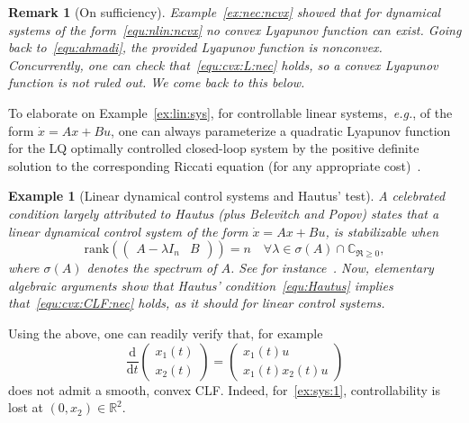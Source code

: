 \documentclass[letterpaper, 10 pt, conference]{ieeeconf}  %
\theoremstyle{mystyle}
\newtheorem{example}[theorem]{Example}
\newtheorem{remark}[theorem]{Remark}
\begin{document}
\begin{remark}[On sufficiency]
\label{rem:suff}
 Example~\ref{ex:nec:ncvx} showed that for dynamical systems of the form~\eqref{equ:nlin:ncvx} no convex Lyapunov function can exist. Going back to~\eqref{equ:ahmadi}, the provided Lyapunov function is nonconvex. Concurrently, one can check that~\eqref{equ:cvx:L:nec} holds, so a convex Lyapunov function is not ruled out. We come back to this below.   
\end{remark}

To elaborate on Example~\ref{ex:lin:sys}, for controllable linear systems,~\textit{e.g.}, of the form $\dot{x}=Ax+Bu$, one can always parameterize a quadratic Lyapunov function for the LQ optimally controlled closed-loop system by the positive definite solution to the corresponding Riccati equation (for any appropriate cost)~\cite[Thm.~42, Ex.~8.5.4]{ref:sontag2013mathematical}.

\begin{example}[Linear dynamical control systems and Hautus' test]
\label{ex:lin:control:sys}
A celebrated condition largely attributed to Hautus (plus Belevitch and Popov) states that a linear dynamical control system of the form $\dot{x}=Ax+Bu$, is stabilizable when 
\begin{equation}
    \label{equ:Hautus}
    \mathrm{rank}\left( \begin{pmatrix}A-\lambda I_n & B \end{pmatrix} \right)=n \quad \forall \lambda \in \sigma(A)\cap \mathbb{C}_{\Re\geq 0}, 
\end{equation}
where $\sigma(A)$ denotes the spectrum of $A$. See for instance~\cite[Ch.~3]{ref:trentelman2012control}.
Now, elementary algebraic arguments show that Hautus' condition~\eqref{equ:Hautus} implies that~\eqref{equ:cvx:CLF:nec} holds, as it should for linear control systems. 
\end{example}

Using the above, one can readily verify that, for example 
\begin{equation}
\label{ex:sys:1}
\frac{\mathrm{d}}{\mathrm{d}t}
    \begin{pmatrix}
        {x_1}(t)\\ {x_2}(t)
    \end{pmatrix} = \begin{pmatrix}
        x_1(t) u\\ x_1(t)x_2(t) u
    \end{pmatrix}
\end{equation}
does not admit a smooth, convex CLF. Indeed, for~\eqref{ex:sys:1}, controllability is lost at $(0,x_2)\in \mathbb{R}^2$. 
\end{document}
